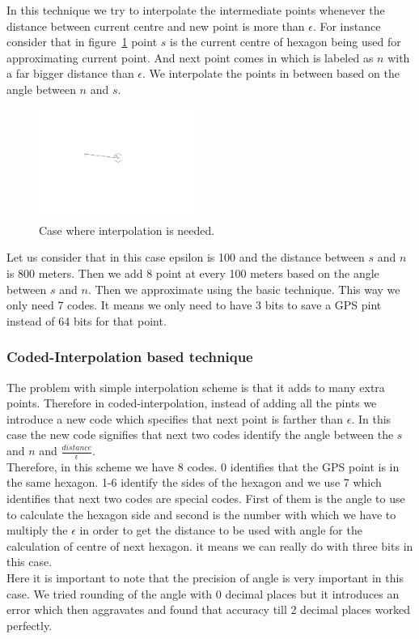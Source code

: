 \documentclass[conference]{IEEEtran}
\begin{document}
In this technique we try to interpolate the intermediate points whenever the distance between current centre and new point is more than $\epsilon$. For instance consider that in figure~\ref{fig:basic-interpolation} point $s$ is the current centre of hexagon being used for approximating current point. And next point comes in which is labeled as $n$ with a far bigger distance than $\epsilon$. We interpolate the points in between based on the angle between $n$ and $s$. 
\begin{figure}[ht]
  \centering
  \includegraphics[width=2in]{images/interpolation.pdf}
  \caption {Case where interpolation is needed.}
  \label{fig:basic-interpolation}
\end{figure}

Let us consider that in this case epsilon is 100 and the distance between $s$ and $n$ is 800 meters. Then we add 8 point at every 100 meters based on the angle between $s$ and $n$. Then we approximate using the basic technique. This way we only need 7 codes. It means we only need to have 3 bits to save a GPS pint instead of 64 bits for that point. 

\subsubsection{Coded-Interpolation based technique}

 The problem with simple interpolation scheme is that it adds to many extra points. Therefore in coded-interpolation, instead of adding all the pints we introduce a new code which specifies that next point is farther than $\epsilon$. In this case the new code signifies that next two codes identify the angle between the $s$ and $n$ and $\frac{distance}{\epsilon}$.\\
 Therefore, in this scheme we have 8 codes. 0 identifies that the GPS point is in the same hexagon. 1-6 identify the sides of the hexagon and we use 7 which identifies that next two codes are special codes. First of them is the angle to use to calculate the hexagon side and second is the number with which we have to multiply the $\epsilon$ in order to get the distance to be used with angle for the calculation of centre of next hexagon. it means we can really do with three bits in this case.\\
 Here it is important to note that the precision of angle is very important in this case. We tried rounding of the angle with 0 decimal places but it introduces an error which then aggravates and found that accuracy till 2 decimal places worked perfectly.
 
\end{document}

